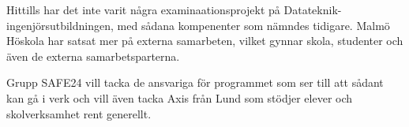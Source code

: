 
\begin{dedication} %

Hittills har det inte varit några examinaationsprojekt på Datateknik-ingenjörsutbildningen, med sådana kompenenter som nämndes tidigare. Malmö Höskola har satsat mer på externa samarbeten, vilket gynnar skola, studenter och även de externa samarbetsparterna.

Grupp SAFE24 vill tacka de ansvariga för programmet som ser till att sådant kan gå i verk och vill även tacka Axis från Lund som stödjer elever och skolverksamhet rent generellt.

\end{dedication}

